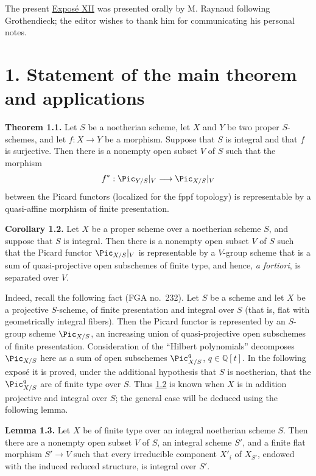 The present \hyperlink{sga6.e12.expose}{Expos\'e XII} was presented orally by M. Raynaud following
Grothendieck; the editor wishes to thank him for communicating his personal
notes.

\section*{1. Statement of the main theorem and applications}

\textbf{Theorem 1.1.} Let $S$ be a noetherian scheme, let $X$ and $Y$ be two
proper $S$-schemes, and let $f:X\to Y$ be a morphism. Suppose that $S$ is
integral and that $f$ is surjective. Then there is a nonempty open subset $V$
of $S$ such that the morphism
\[
  f^*:\Pic_{Y/S}|_V\longrightarrow\Pic_{X/S}|_V
\]
between the Picard functors (localized for the fppf topology) is representable
by a quasi-affine morphism of finite presentation.

\textbf{Corollary 1.2.} Let $X$ be a proper scheme over a noetherian scheme
$S$, and suppose that $S$ is integral. Then there is a nonempty open subset
$V$ of $S$ such that the Picard functor $\Pic_{X/S}|_V$ is representable by a
$V$-group scheme that is a sum of quasi-projective open subschemes of finite
type, and hence, \emph{a fortiori}, is separated over $V$.

Indeed, recall the following fact (FGA no.~232). Let $S$ be a scheme and let
$X$ be a projective $S$-scheme, of finite presentation and integral over $S$
(that is, flat with geometrically integral fibers). Then the Picard functor is
represented by an $S$-group scheme $\Pic_{X/S}$, an increasing union of
quasi-projective open subschemes of finite presentation. Consideration of the
``Hilbert polynomials'' decomposes $\Pic_{X/S}$ here as a sum of open
subschemes $\Pic^q_{X/S}$, $q\in\mathbb Q[t]$. In the following expos\'e it is
proved, under the additional hypothesis that $S$ is noetherian, that the
$\Pic^q_{X/S}$ are of finite type over $S$. Thus \hyperlink{sga6.e12.cor.1-2}{1.2} is known when $X$ is in
addition projective and integral over $S$; the general case will be deduced
using the following lemma.

\textbf{Lemma 1.3.} Let $X$ be of finite type over an integral noetherian
scheme $S$. Then there are a nonempty open subset $V$ of $S$, an integral
scheme $S'$, and a finite
flat morphism $S'\to V$ such that every irreducible component $X'_i$ of
$X_{S'}$, endowed with the induced reduced structure, is integral over $S'$.

